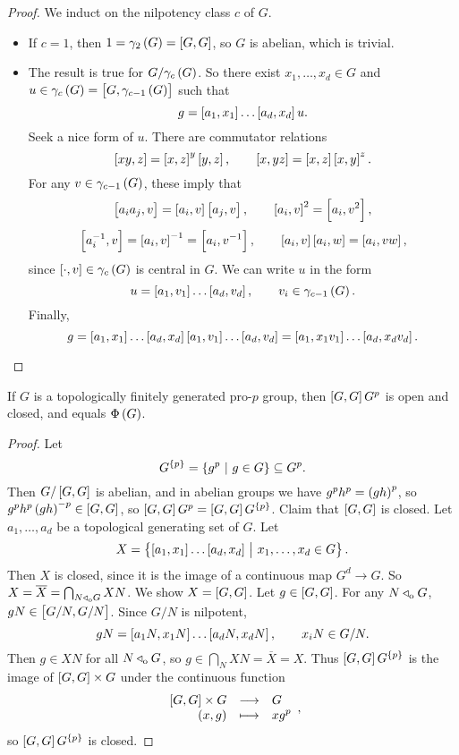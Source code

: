 \begin{proof}
We induct on the nilpotency class $ c $ of $ G $.
\begin{itemize}
\item If $ c = 1 $, then $ 1 = \gamma_2\br{G} = \sbr{G, G} $, so $ G $ is abelian, which is trivial.
\item The result is true for $ G / \gamma_c\br{G} $. So there exist $ x_1, \dots, x_d \in G $ and $ u \in \gamma_c\br{G} = \sbr{G, \gamma_{c - 1}\br{G}} $ such that
$$ g = \sbr{a_1, x_1} \dots \sbr{a_d, x_d}u. $$
Seek a nice form of $ u $. There are commutator relations
$$ \sbr{xy, z} = \sbr{x, z}^y\sbr{y, z}, \qquad \sbr{x, yz} = \sbr{x, z}\sbr{x, y}^z. $$
For any $ v \in \gamma_{c - 1}\br{G} $, these imply that
$$ \sbr{a_ia_j, v} = \sbr{a_i, v}\sbr{a_j, v}, \qquad \sbr{a_i, v}^2 = \sbr{a_i, v^2}, $$
$$ \sbr{a_i^{-1}, v} = \sbr{a_i, v}^{-1} = \sbr{a_i, v^{-1}}, \qquad \sbr{a_i, v}\sbr{a_i, w} = \sbr{a_i, vw}, $$
since $ \sbr{\cdot, v} \in \gamma_c\br{G} $ is central in $ G $. We can write $ u $ in the form
$$ u = \sbr{a_1, v_1} \dots \sbr{a_d, v_d}, \qquad v_i \in \gamma_{c - 1}\br{G}. $$
Finally,
$$ g = \sbr{a_1, x_1} \dots \sbr{a_d, x_d}\sbr{a_1, v_1} \dots \sbr{a_d, v_d} = \sbr{a_1, x_1v_1} \dots \sbr{a_d, x_dv_d}. $$
\end{itemize}
\end{proof}

\begin{proposition}
If $ G $ is a topologically finitely generated pro-$ p $ group, then $ \sbr{G, G}G^p $ is open and closed, and equals $ \Phi\br{G} $.
\end{proposition}

\begin{proof}
Let
$$ G^{\cbr{p}} = \cbr{g^p \st g \in G} \subseteq G^p. $$
Then $ G / \sbr{G, G} $ is abelian, and in abelian groups we have $ g^ph^p = \br{gh}^p $, so $ g^ph^p\br{gh}^{-p} \in \sbr{G, G} $, so $ \sbr{G, G}G^p = \sbr{G, G}G^{\cbr{p}} $. Claim that $ \sbr{G, G} $ is closed. Let $ a_1, \dots, a_d $ be a topological generating set of $ G $. Let
$$ X = \cbr{\sbr{a_1, x_1} \dots \sbr{a_d, x_d} \st x_1, \dots, x_d \in G}. $$
Then $ X $ is closed, since it is the image of a continuous map $ G^d \to G $. So $ X = \overline{X} = \bigcap_{N \triangleleft_{\mathrm{o}} G} XN $. We show $ X = \sbr{G, G} $. Let $ g \in \sbr{G, G} $. For any $ N \triangleleft_{\mathrm{o}} G $, $ gN \in \sbr{G / N, G / N} $. Since $ G / N $ is nilpotent,
$$ gN = \sbr{a_1N, x_1N} \dots \sbr{a_dN, x_dN}, \qquad x_iN \in G / N. $$
Then $ g \in XN $ for all $ N \triangleleft_{\mathrm{o}} G $, so $ g \in \bigcap_N XN = \overline{X} = X $. Thus $ \sbr{G, G}G^{\cbr{p}} $ is the image of $ \sbr{G, G} \times G $ under the continuous function
$$ \function{\sbr{G, G} \times G}{G}{\br{x, g}}{xg^p}, $$
so $ \sbr{G, G}G^{\cbr{p}} $ is closed.
\end{proof}

